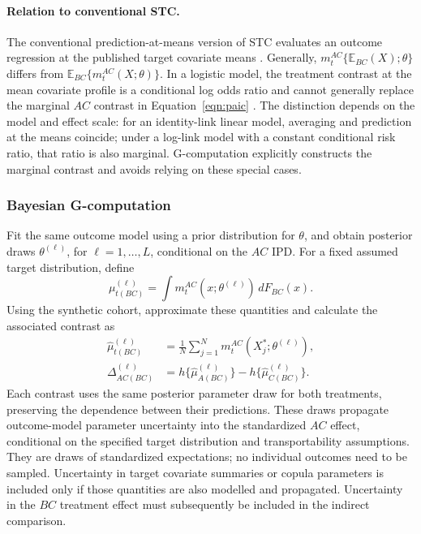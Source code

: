\documentclass[article]{jss}
\begin{document}
\paragraph{Relation to conventional STC.}
The conventional prediction-at-means version of STC evaluates an outcome regression at the published target covariate means \citep{caro2010,ishak2015}. Generally, $m_t^{AC}\{\mathbb{E}_{BC}(X);\theta\}$ differs from $\mathbb{E}_{BC}\{m_t^{AC}(X;\theta)\}$. In a logistic model, the treatment contrast at the mean covariate profile is a conditional log odds ratio and cannot generally replace the marginal $AC$ contrast in Equation~\ref{eqn:paic} \citep{remiro2021conflating}. The distinction depends on the model and effect scale: for an identity-link linear model, averaging and prediction at the means coincide; under a log-link model with a constant conditional risk ratio, that ratio is also marginal. G-computation explicitly constructs the marginal contrast and avoids relying on these special cases.

\subsubsection{Bayesian G-computation}
Fit the same outcome model using a prior distribution for $\theta$, and obtain posterior draws $\theta^{(\ell)}$, for $\ell=1,\ldots,L$, conditional on the $AC$ IPD. For a fixed assumed target distribution, define
\begin{equation}
\label{eqn:marginal-outcome-bayesian}
\mu^{(\ell)}_{t(BC)}=
\int m_t^{AC}(x;\theta^{(\ell)})\,dF_{BC}(x).
\end{equation}
Using the synthetic cohort, approximate these quantities and calculate the associated contrast as
\begin{equation}
\label{eqn:approx-marginal-bayes}
\begin{split}
\widehat\mu^{(\ell)}_{t(BC)}
&=\frac{1}{N}\sum_{j=1}^{N}m_t^{AC}(X_j^*;\theta^{(\ell)}),\\
\Delta^{(\ell)}_{AC(BC)}
&=h\{\widehat\mu^{(\ell)}_{A(BC)}\}
 -h\{\widehat\mu^{(\ell)}_{C(BC)}\}.
\end{split}
\end{equation}
Each contrast uses the same posterior parameter draw for both treatments, preserving the dependence between their predictions. These draws propagate outcome-model parameter uncertainty into the standardized $AC$ effect, conditional on the specified target distribution and transportability assumptions. They are draws of standardized expectations; no individual outcomes need to be sampled. Uncertainty in target covariate summaries or copula parameters is included only if those quantities are also modelled and propagated. Uncertainty in the $BC$ treatment effect must subsequently be included in the indirect comparison.
\end{document}
